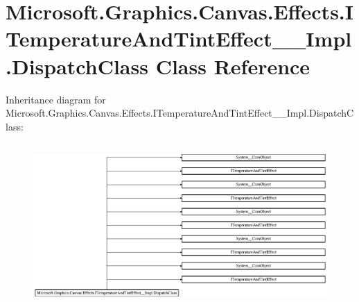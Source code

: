 \hypertarget{class_microsoft_1_1_graphics_1_1_canvas_1_1_effects_1_1_i_temperature_and_tint_effect_____impl_1_1_dispatch_class}{}\section{Microsoft.\+Graphics.\+Canvas.\+Effects.\+I\+Temperature\+And\+Tint\+Effect\+\_\+\+\_\+\+Impl.\+Dispatch\+Class Class Reference}
\label{class_microsoft_1_1_graphics_1_1_canvas_1_1_effects_1_1_i_temperature_and_tint_effect_____impl_1_1_dispatch_class}
Inheritance diagram for Microsoft.\+Graphics.\+Canvas.\+Effects.\+I\+Temperature\+And\+Tint\+Effect\+\_\+\+\_\+\+Impl.\+Dispatch\+Class\+:\begin{figure}[H]
\begin{center}
\leavevmode
\includegraphics[height=6.260162cm]{class_microsoft_1_1_graphics_1_1_canvas_1_1_effects_1_1_i_temperature_and_tint_effect_____impl_1_1_dispatch_class}
\end{center}
\end{figure}
